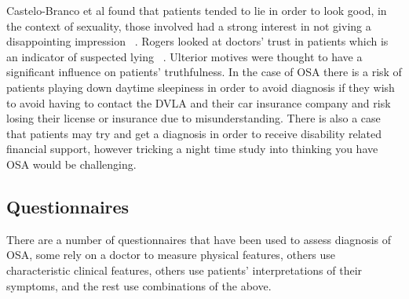 Castelo-Branco et al found that patients tended to lie in order to look good, in the context of sexuality, those involved had a strong interest in not giving a disappointing impression ~\cite{castelo2010patients}. Rogers looked at doctors’ trust in patients which is an indicator of suspected lying ~\cite{rogers2002there}. Ulterior motives were thought to have a significant influence on patients’ truthfulness. In the case of OSA there is a risk of patients playing down daytime sleepiness in order to avoid diagnosis if they wish to avoid having to contact the DVLA and their car insurance company and risk losing their license or insurance due to misunderstanding. There is also a case that patients may try and get a diagnosis in order to receive disability related financial support, however tricking a night time study into thinking you have OSA would be challenging. 

\subsection{Questionnaires}
There are a number of questionnaires that have been used to assess diagnosis of OSA, some rely on a doctor to measure physical features, others use characteristic clinical features, others use patients’ interpretations of their symptoms, and the rest use combinations of the above. 

